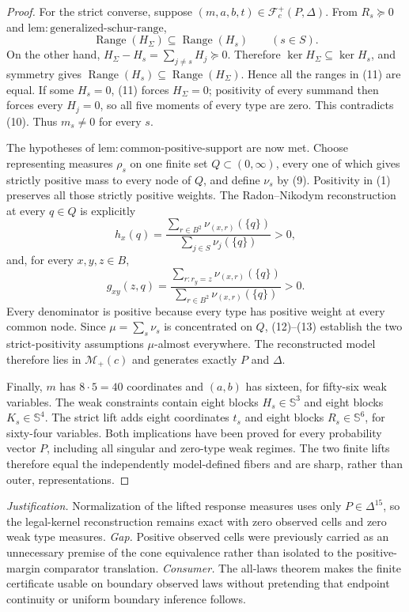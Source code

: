 \documentclass{article}
\begin{document}
\begin{proof}
For the strict converse, suppose \((m,a,b,t)\in\mathcal F_c^+(P,\Delta)\).  From \(R_s\succeq0\) and \(\mathrm{lem{:}generalized\text{-}schur\text{-}range}\),
\[
 \operatorname{Range}(H_\Sigma)\subseteq\operatorname{Range}(H_s)
 \qquad(s\in S). \tag{11}
\]
On the other hand, \(H_\Sigma-H_s=\sum_{j\ne s}H_j\succeq0\).  Therefore \(\ker H_\Sigma\subseteq\ker H_s\), and symmetry gives \(\operatorname{Range}(H_s)\subseteq\operatorname{Range}(H_\Sigma)\).  Hence all the ranges in (11) are equal.  If some \(H_s=0\), (11) forces \(H_\Sigma=0\); positivity of every summand then forces every \(H_j=0\), so all five moments of every type are zero.  This contradicts (10).  Thus \(m_s\ne0\) for every \(s\).

The hypotheses of \(\mathrm{lem{:}common\text{-}positive\text{-}support}\) are now met.  Choose representing measures \(\rho_s\) on one finite set \(Q\subset(0,\infty)\), every one of which gives strictly positive mass to every node of \(Q\), and define \(\nu_s\) by (9).  Positivity in (1) preserves all those strictly positive weights.  The Radon--Nikodym reconstruction at every \(q\in Q\) is explicitly
\[
 h_x(q)=
 \frac{\sum_{r\in B^2}\nu_{(x,r)}(\{q\})}
      {\sum_{j\in S}\nu_j(\{q\})}>0, \tag{12}
\]
and, for every \(x,y,z\in B\),
\[
 g_{xy}(z,q)=
 \frac{\sum_{r:r_y=z}\nu_{(x,r)}(\{q\})}
      {\sum_{r\in B^2}\nu_{(x,r)}(\{q\})}>0. \tag{13}
\]
Every denominator is positive because every type has positive weight at every common node.  Since \(\mu=\sum_s\nu_s\) is concentrated on \(Q\), (12)--(13) establish the two strict-positivity assumptions \(\mu\)-almost everywhere.  The reconstructed model therefore lies in \(\mathcal M_+(c)\) and generates exactly \(P\) and \(\Delta\).

Finally, \(m\) has \(8\cdot5=40\) coordinates and \((a,b)\) has sixteen, for fifty-six weak variables.  The weak constraints contain eight blocks \(H_s\in\mathbb S^3\) and eight blocks \(K_s\in\mathbb S^4\).  The strict lift adds eight coordinates \(t_s\) and eight blocks \(R_s\in\mathbb S^6\), for sixty-four variables.  Both implications have been proved for every probability vector \(P\), including all singular and zero-type weak regimes.  The two finite lifts therefore equal the independently model-defined fibers and are sharp, rather than outer, representations.
\end{proof}
\par\smallskip\noindent \textit{Justification.} Normalization of the lifted response measures uses only \(P\in\Delta^{15}\), so the legal-kernel reconstruction remains exact with zero observed cells and zero weak type measures. \textit{Gap.} Positive observed cells were previously carried as an unnecessary premise of the cone equivalence rather than isolated to the positive-margin comparator translation. \textit{Consumer.} The all-laws theorem makes the finite certificate usable on boundary observed laws without pretending that endpoint continuity or uniform boundary inference follows.
\end{document}
